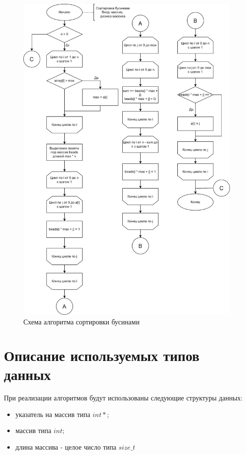 \clearpage

\begin{figure}[h]
	\centering
	\includegraphics[height=0.8\textheight]{img/bead.png}
	\caption{Схема алгоритма сортировки бусинами}
	\label{fig:bead}
\end{figure}

\clearpage

\section{Описание используемых типов данных}

При реализации алгоритмов будут использованы следующие структуры данных:

\begin{itemize}[label=---]
	\item указатель на массив типа $int *$;
	\item массив типа $int$;
	\item длина массива - целое число типа $size\_t$
\end{itemize}

